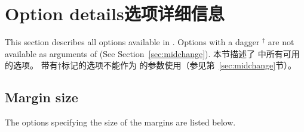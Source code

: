 \section{Option details\hfill 选项详细信息}
\begin{paracol}{2}
This section describes all options available in \Gm.
Options with a dagger $^\dagger$ are not available 
as arguments of  (See Section~\ref{sec:midchange}).
\switchcolumn
本节描述了 \Gm 中所有可用的选项。
带有†标记的选项不能作为  的参数使用（参见第~\ref{sec:midchange}节）。
\end{paracol}

% 
% 
% 
 
\subsection{Margin size}\label{sec:margin}

The options specifying the size of the margins are listed below.

